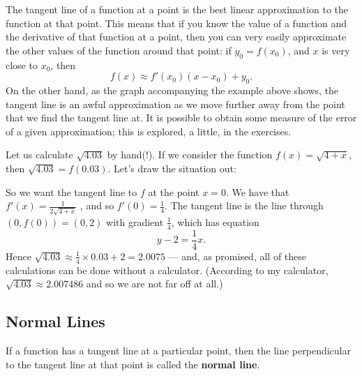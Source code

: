 The tangent line of a function at a point is the best linear approximation to the function at that point. This
means that if you know the value of a function and the derivative of that function at a point, then you can very
easily approximate the other values of the function around that point: if $ y_0 = f(x_0) $, and $ x $ is very
close to $ x_0 $, then
\begin{displaymath}
f(x) \approx f'(x_0)(x - x_0) + y_0.
\end{displaymath}
On the other hand, as the graph accompanying the example above shows, the tangent line is an awful approximation as
we move further away from the point that we find the tangent line at. It is possible to obtain some measure of the
error of a given approximation; this is explored, a little, in the exercises.

\begin{ex}
  Let us calculate $ \sqrt{4.03} $ by hand(!). If we consider the function $ f(x) = \sqrt{4 + x} $,
  then $ \sqrt{4.03} = f(0.03) $. Let's draw the situation out:
  \begin{center}
  \end{center}
  So we want the tangent line to $ f $ at the point $ x = 0 $. We have that $ f'(x) = \frac{1}{2\sqrt{4 + x}} $ ,
  and so $ f'(0) = \frac{1}{4} $. The tangent line is the line through $ (0, f(0)) = (0, 2) $ with gradient $ \frac{1}{4} $,
  which has equation
  \begin{displaymath}
    y - 2 = \frac{1}{4}x.
  \end{displaymath}
  Hence $ \sqrt{4.03} \approx \frac{1}{4} \times 0.03 + 2 = 2.0075 $ --- and, as promised, all of these calculations
  can be done without a calculator. (According to my calculator, $ \sqrt{4.03} \approx 2.007486 $ and so we are not far
  off at all.)
\end{ex}

\subsection*{Normal Lines}
If a function has a tangent line at a particular point, then the line perpendicular to the tangent line
at that point is called the \textbf{normal line}.

